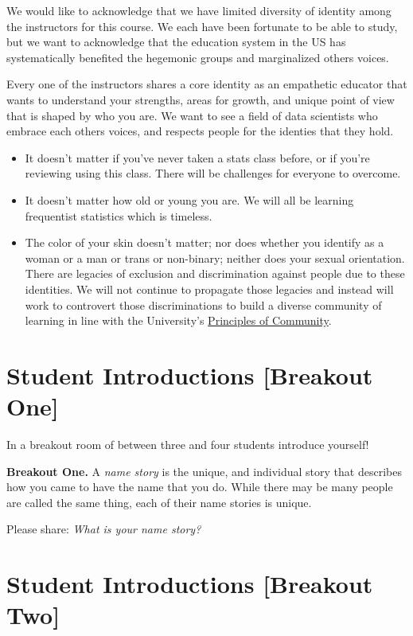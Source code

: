 \documentclass[
  letterpaper,
  DIV=11,
  numbers=noendperiod]{scrreprt}
\providecommand{\tightlist}{%
  \setlength{\itemsep}{0pt}\setlength{\parskip}{0pt}}\usepackage{longtable,booktabs,array}
\begin{document}
We would like to acknowledge that we have limited diversity of identity
among the instructors for this course. We each have been fortunate to be
able to study, but we want to acknowledge that the education system in
the US has systematically benefited the hegemonic groups and
marginalized others voices.

Every one of the instructors shares a core identity as an empathetic
educator that wants to understand your strengths, areas for growth, and
unique point of view that is shaped by who you are. We want to see a
field of data scientists who embrace each others voices, and respects
people for the identies that they hold.

\begin{itemize}
\tightlist
\item
  It doesn't matter if you've never taken a stats class before, or if
  you're reviewing using this class. There will be challenges for
  everyone to overcome.
\item
  It doesn't matter how old or young you are. We will all be learning
  frequentist statistics which is timeless.
\item
  The color of your skin doesn't matter; nor does whether you identify
  as a woman or a man or trans or non-binary; neither does your sexual
  orientation. There are legacies of exclusion and discrimination
  against people due to these identities. We will not continue to
  propagate those legacies and instead will work to controvert those
  discriminations to build a diverse community of learning in line with
  the University's
  \href{https://diversity.berkeley.edu/principles-community}{Principles
  of Community}.
\end{itemize}

\section{Student Introductions {[}Breakout
One{]}}\label{student-introductions-breakout-one}

In a breakout room of between three and four students introduce
yourself!

\textbf{Breakout One.} A \emph{name story} is the unique, and individual
story that describes how you came to have the name that you do. While
there may be many people are called the same thing, each of their name
stories is unique.

Please share: \emph{What is your name story?}

\section{Student Introductions {[}Breakout
Two{]}}\label{student-introductions-breakout-two}
\end{document}

